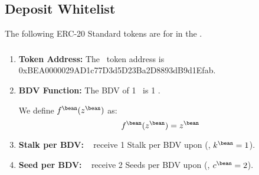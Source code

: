 \documentclass[class=article, crop=false]{standalone}
\begin{document}
\subsection{Deposit Whitelist}
The following ERC-20 Standard tokens are  for  in the .
\subsubsection{\Bean}
    \begin{enumerate}
        \item \textbf{Token Address:} The \Bean\ token address is 0xBEA0000029AD1c77D3d5D23Ba2D8893dB9d1Efab.
        \item \textbf{BDV Function:} The BDV of 1 \Bean\ is 1 \Bean. 

We define $f^{\bean}(z^{\bean})$ as:
$$f^{\bean}(z^{\bean}) = z^{\bean}$$
        \item \textbf{Stalk per BDV:} \Bean\  receive 1 Stalk per BDV upon  (, $k^{\bean} = 1$).
        \item \textbf{Seed per BDV:} \Bean\  receive 2 Seeds per BDV upon  (, $c^{\bean} = 2$).
    \end{enumerate}
\end{document}
